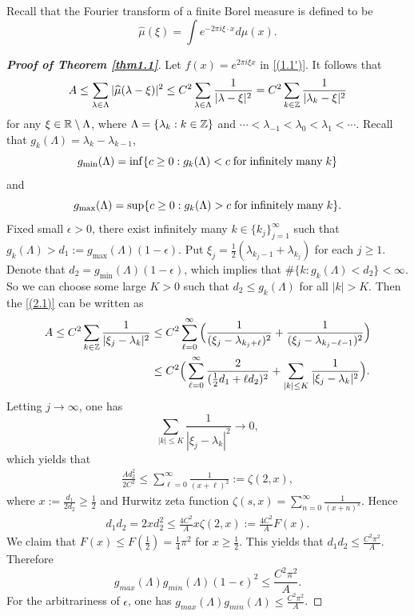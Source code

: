 \documentclass[12pt,psfig,reqno]{amsart}
\numberwithin{equation}{section}
\theoremstyle{plain}
\begin{document}
Recall that the Fourier transform of a finite Borel measure is defined to be 
$$
\widehat{\mu}(\xi)=\int e^{-2\pi i\xi\cdot x}d\mu(x).
$$
\begin{proof}[\textbf{Proof of Theorem \ref{thm1.1}}]
Let $f(x)=e^{2\pi i \xi x}$ in \eqref{(1.1')}. 
It follows that 
\begin{align}\label{(2.1)}
	A\leq \sum_{\lambda\in\Lambda}|\widehat{\mu}(\lambda-\xi)|^2\leq 
	C^2\sum_{\lambda\in\Lambda}\frac{1}{|\lambda-\xi|^2}
	=	C^2\sum_{k\in\Bbb Z}\frac{1}{|\lambda_k-\xi|^2} 
\end{align}
for any $\xi\in\Bbb R\setminus\Lambda$, where $\Lambda=\{\lambda_k:k\in\Bbb Z\}$ and $\cdots<\lambda_{-1}<\lambda_0<\lambda_1<\cdots$. 
Recall that $g_k(\Lambda)=\lambda_k-\lambda_{k-1}$, 
\[
g_{\min}(\Lambda) = \inf\{c\geq0:g_k(\Lambda)<c\;\text{for\;infinitely\;many\;}k\}
\]
and 
\[
g_{\max}(\Lambda) = \sup\{c\geq0:g_k(\Lambda)>c\;\text{for\;infinitely\;many\;}k\}.
\]
Fixed small $\epsilon>0$, there exist infinitely many $k\in\{k_j\}_{j=1}^\infty$ such that $g_k(\Lambda)>d_1:=g_{\max}(\Lambda)(1-\epsilon)$. 
Put $\xi_j=\frac12(\lambda_{k_j-1}+\lambda_{k_j})$ for each $j\geq1$. 
Denote that $d_2=g_{\min}(\Lambda)(1-\epsilon)$, which implies that  $\#\{k:g_k(\Lambda)<d_2\}<\infty$. 
So we can choose some large $K>0$ such that $d_2\leq g_k(\Lambda)$ for all $|k|>K$. 
Then the \eqref{(2.1)} can be written as 
\begin{align}\label{(2.2)}
	A\leq C^2\sum_{k\in\Bbb Z}\frac{1}{|\xi_{j}-\lambda_k|^2}
	&\leq C^2\sum_{\ell=0}^\infty\Big(\frac{1}{(\xi_j-\lambda_{k_j+\ell})^2}+\frac{1}{(\xi_j-\lambda_{k_j-\ell-1})^2}\Big)
	\\
	&\notag\leq C^2\Big(\sum_{\ell=0}^\infty\frac{2}{(\frac12d_1+\ell d_2)^2}+\sum_{|k|\leq K}\frac{1}{|\xi_{j}-\lambda_k|^2}\Big).
\end{align}
Letting $j\rightarrow\infty$, one has $$\sum_{|k|\leq K}\frac{1}{|\xi_{j}-\lambda_k|^2}\rightarrow0,$$
which yields that 
\begin{align*}
	\frac{Ad_2^2}{2C^2}\leq  \sum_{\ell=0}^\infty\frac{1}{(x+\ell)^2}:=\zeta(2,x),
\end{align*}
where $x:=\frac{d_1}{2d_2}\geq \frac12$ and Hurwitz zeta function $\zeta(s,x)=\sum_{n=0}^\infty\frac{1}{(x+n)^s}$. 
Hence 
\begin{align*}
d_1d_2=2xd_2^2\leq \frac{4C^2}{A}x\zeta(2,x):=\frac{4C^2}{A}F(x).
\end{align*}
We claim that $F(x)\leq F(\frac12)=\frac14\pi^2$ for $x\geq\frac12$. 
This yields that $d_1d_2\leq \frac{C^2\pi^2}{A}$. 
Therefore 
$$
g_{max}(\Lambda)g_{min}(\Lambda)(1-\epsilon)^2\leq \frac{C^2\pi^2}{A}.
$$
For the arbitrariness of $\epsilon$, one has 
$g_{max}(\Lambda)g_{min}(\Lambda)\leq\frac{C^2\pi^2}{A}$.


\end{proof}
\end{document}
